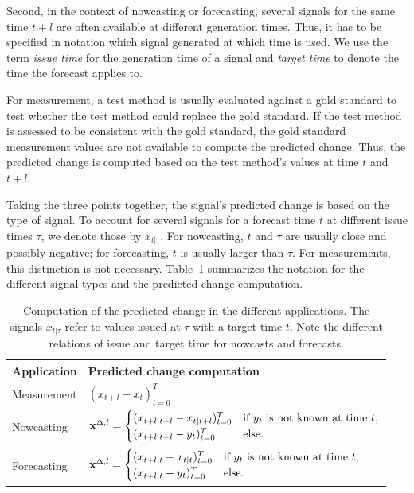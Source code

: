 Second, in the context of nowcasting or forecasting, several signals for the same time $t + l$ are often available at different generation times.
Thus, it has to be specified in notation which signal generated at which time is used.
We use the term \textit{issue time} for the generation time of a signal and \textit{target time} to denote the time the forecast applies to.

For measurement, a test method is usually evaluated against a gold standard to test whether the test method could replace the gold standard.
If the test method is assessed to be consistent with the gold standard, the gold standard measurement values are not available to compute the predicted change.
Thus, the predicted change is computed based on the test method's values at time $t$ and $t + l$.

Taking the three points together, the signal's predicted change is based on the type of signal.
To account for several signals for a forecast time $t$ at different issue times $\tau$, we denote those by $x_{t | \tau}$.
For nowcasting, $t$ and $\tau$ are usually close and possibly negative; for forecasting, $t$ is usually larger than $\tau$.
For measurements, this distinction is not necessary.
Table~\ref{tab:notation} summarizes the notation for the different signal types and the predicted change computation.

\begin{table}
    \centering
    \begin{tabularx}{0.75\textwidth}{l X}
        \toprule
        Application & Predicted change computation \\
        \midrule
        Measurement & $(x_{t + l} - x_t)_{t=0}^T \label{eq:diffxl_measure} $\\
        Nowcasting & $
\mathbf{x}^{\Delta,l} =
\begin{cases}
(x_{t+l|t+l} -x_{t|t+l})^T_{t=0} & \text{if } y_{t} \text{ is not known at time } t, \\
(x_{t+l|t+l} -y_{t})^T_{t=0} & \text{else}.
\end{cases} \label{eq:diffxl_nowcasting}
$ \\
        Forecasting & $
\mathbf{x}^{\Delta,l} =
\begin{cases}
(x_{t+l|t} - x_{t|t})^T_{t=0} & \text{if } y_{t} \text{ is not known at time } t, \\
(x_{t+l|t} - y_{t})^T_{t=0}  & \text{else}.
\end{cases} \label{eq:diffxl_forecasting}
$\\
        \bottomrule
    \end{tabularx}
    \caption{Computation of the predicted change in the different applications. The signals $x_{t | \tau}$ refer to values issued at $\tau$ with a target time $t$. Note the different relations of issue and target time for nowcasts and forecasts. }
    \label{tab:notation}
\end{table}


